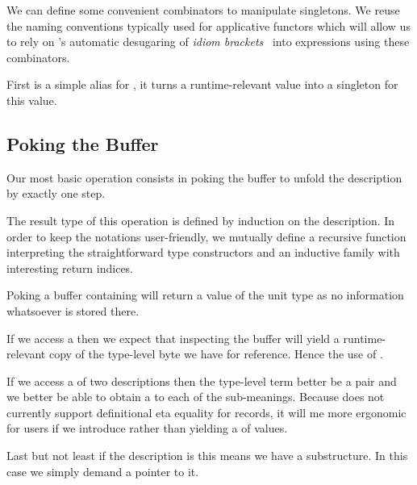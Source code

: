 We can define some convenient combinators to manipulate
singletons.
%
We reuse the naming conventions typically used for applicative
functors which will allow us to rely on \idris{}'s automatic
desugaring of \emph{idiom brackets}~\cite{DBLP:journals/jfp/McbrideP08}
into expressions using these combinators.


First  is a simple alias for ,
it turns a runtime-relevant value  into a singleton for
this value.



\subsection{Poking the Buffer}

Our most basic operation consists in poking the buffer to unfold
the description by exactly one step.


The result type of this operation is defined by induction on the
description. In order to keep the notations user-friendly, we
mutually define
a recursive function  interpreting the straightforward type constructors
and an inductive family  with interesting return indices.


Poking a buffer containing  will return a value of
the unit type as no information whatsoever is stored there.

If we access a  then we expect that inspecting the
buffer will yield a runtime-relevant copy of the type-level byte we
have for reference. Hence the use of .

If we access a  of two descriptions then the type-level term
better be a pair and we better be able to obtain a 
to each of the sub-meanings.
%
Because \idris{} does not currently support definitional eta equality
for records, it will me more ergonomic for users if we introduce
 rather than yielding a  of values.

Last but not least if the description is  this means
we have a substructure. In this case we simply demand a pointer to it.



